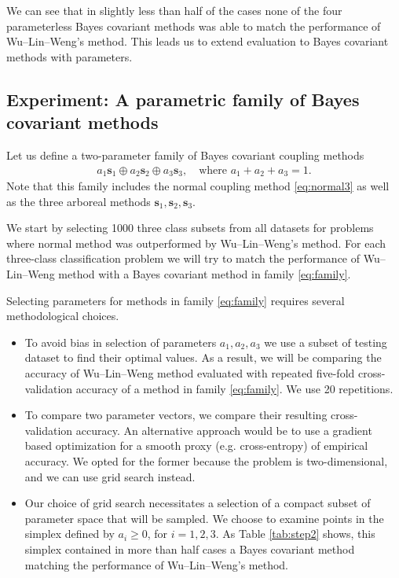 

We can see that in slightly less than half of the cases none of the four parameterless Bayes covariant methods was able to match the performance of Wu--Lin--Weng's method. This leads us to extend evaluation to Bayes covariant methods with parameters. 

\subsection{Experiment: A parametric family of Bayes covariant methods}
\label{sec:exp3}

Let us define a two-parameter family of Bayes covariant coupling methods
\begin{align}
a_1 \boldsymbol{s}_1 \oplus a_2 \boldsymbol{s}_2 \oplus a_3 \boldsymbol{s}_3,\quad\textrm{where } a_1 + a_2 +a_3 = 1. \label{eq:family}
\end{align}
Note that this family includes the normal coupling method \eqref{eq:normal3} as well as the three arboreal methods $\boldsymbol{s}_1, \boldsymbol{s}_2, \boldsymbol{s}_3$.

We start by selecting 1000 three class subsets from all datasets for problems where normal method was outperformed by Wu--Lin--Weng's method. For each three-class classification problem we will try to match the performance of Wu--Lin--Weng method with a Bayes covariant method in family \eqref{eq:family}.

Selecting parameters for methods in family \eqref{eq:family} requires several methodological choices. 
\begin{itemize}
\item To avoid bias in selection of parameters $a_1, a_2, a_3$ we use a subset of testing dataset to find their optimal values. As a result, we will be comparing the accuracy of Wu--Lin--Weng method evaluated with repeated five-fold cross-validation accuracy of a method in family \eqref{eq:family}. We use 20 repetitions.
\item To compare two parameter vectors, we compare their resulting cross-validation accuracy. An alternative approach would be to use  a gradient based optimization for a smooth proxy (e.g. cross-entropy) of empirical accuracy. We opted for the former because the problem is two-dimensional, and we can use grid search instead.
\item Our choice of grid search necessitates a selection of a compact subset of parameter space that will be sampled. We choose to examine points in the simplex defined by  $a_i\geq 0$, for $i=1,2,3$. As Table \ref{tab:step2} shows, this simplex contained in more than half cases a Bayes covariant method matching the performance of Wu--Lin--Weng's method.
\end{itemize}


